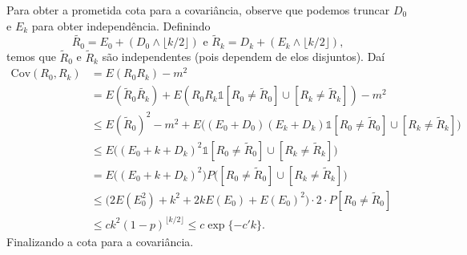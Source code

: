 \documentclass[reqno, draft]{book}
\newcommand*\1{\mathds{1}}
\begin{document}
Para obter a prometida cota para a covariância, observe que podemos truncar $D_0$ e $E_k$ para obter independência.
Definindo
\begin{equation}
  \tilde{R_0} = E_0 + ( D_0 \wedge \lfloor k/2 \rfloor ) \text{ e } \tilde{R}_k = D_k + ( E_k \wedge \lfloor k/2 \rfloor ),
\end{equation}
temos que $\tilde{R}_0$ e $\tilde{R}_k$ são independentes (pois dependem de elos disjuntos).
Daí
\begin{equation}
  \begin{split}
    \text{Cov}(R_0, R_k) & = E(R_0 R_k) - m^2\\
    & = E(\tilde{R}_0 \tilde{R_k}) + E(R_0 R_k \1{[R_0 \neq \tilde{R}_0] \cup [R_k \neq \tilde{R}_k]}) - m^2\\
    & \leq E(\tilde{R}_0)^2 - m^2 + E\big( (E_0 + D_0) (E_k + D_k) \1{[R_0 \neq \tilde{R}_0] \cup [R_k \neq \tilde{R}_k]}\big)\\
    & \leq E\big( (E_0 + k + D_k)^2 \1{[R_0 \neq \tilde{R}_0] \cup [R_k \neq \tilde{R}_k]}\big)\\
    & = E\big( (E_0 + k + D_k)^2 \big) P\big([R_0 \neq \tilde{R}_0] \cup[R_k \neq \tilde{R}_k]\big)\\
    & \leq \big( 2 E(E_0^2) + k^2 + 2k E(E_0) + E(E_0)^2 \big) \cdot 2 \cdot P[R_0 \neq \tilde{R}_0]\\
    & \leq c k^2 (1-p)^{\lfloor k/2 \rfloor} \leq c \exp \{-c' k\}.
  \end{split}
\end{equation}
Finalizando a cota para a covariância.

\clearpage

\printindex
\end{document}
